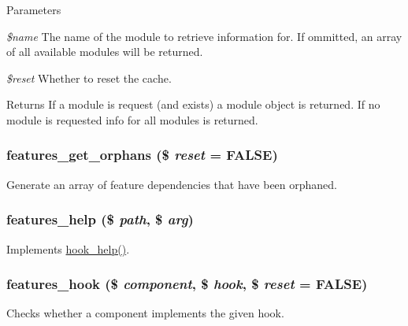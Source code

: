 \begin{DoxyParams}{Parameters}
\item[{\em \$name}]The name of the module to retrieve information for. If ommitted, an array of all available modules will be returned. \item[{\em \$reset}]Whether to reset the cache.\end{DoxyParams}
\begin{DoxyReturn}{Returns}
If a module is request (and exists) a module object is returned. If no module is requested info for all modules is returned. 
\end{DoxyReturn}
\hypertarget{features_8module_a6aae9f9ebb34fabfe11ae61284dde230}{
\subsubsection[{features\_\-get\_\-orphans}]{\setlength{\rightskip}{0pt plus 5cm}features\_\-get\_\-orphans (\$ {\em reset} = {\ttfamily FALSE})}}
\label{features_8module_a6aae9f9ebb34fabfe11ae61284dde230}
Generate an array of feature dependencies that have been orphaned. \hypertarget{features_8module_abc18f3557bf3118b00e725fe283259ab}{
\subsubsection[{features\_\-help}]{\setlength{\rightskip}{0pt plus 5cm}features\_\-help (\$ {\em path}, \/  \$ {\em arg})}}
\label{features_8module_abc18f3557bf3118b00e725fe283259ab}
Implements \hyperlink{group__hooks_ga5589c2714a782738e8851c4c90231f0e}{hook\_\-help()}. \hypertarget{features_8module_aaa5a723655f52c16385d78d0f5997c23}{
\subsubsection[{features\_\-hook}]{\setlength{\rightskip}{0pt plus 5cm}features\_\-hook (\$ {\em component}, \/  \$ {\em hook}, \/  \$ {\em reset} = {\ttfamily FALSE})}}
\label{features_8module_aaa5a723655f52c16385d78d0f5997c23}
Checks whether a component implements the given hook.

